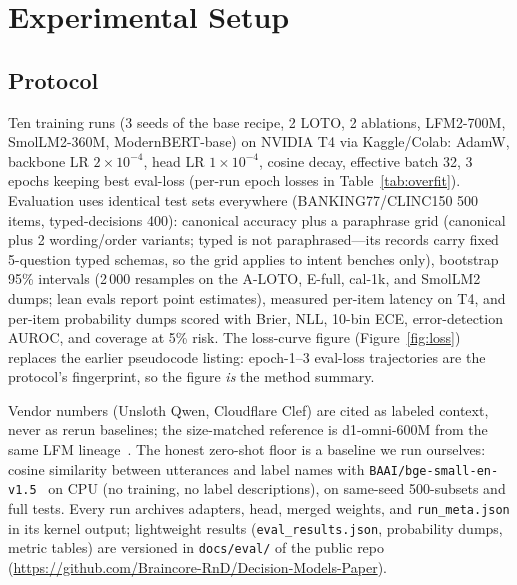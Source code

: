 \section{Experimental Setup}
\subsection{Protocol}
Ten training runs (3 seeds of the base recipe, 2 LOTO, 2 ablations, LFM2-700M,
SmolLM2-360M, ModernBERT-base) on NVIDIA
T4 via Kaggle/Colab: AdamW, backbone LR $2\times10^{-4}$, head LR
$1\times10^{-4}$, cosine decay, effective batch 32, 3 epochs keeping best
eval-loss (per-run epoch losses in Table~\ref{tab:overfit}). Evaluation uses identical test sets everywhere
(BANKING77/CLINC150 500 items, typed-decisions 400): canonical accuracy plus a
paraphrase grid (canonical plus 2 wording/order variants; typed is not
paraphrased---its records carry fixed 5-question typed schemas, so the grid
applies to intent benches only), bootstrap
95\% intervals (2\,000 resamples on the A-LOTO, E-full, cal-1k, and SmolLM2
dumps; lean evals report point
estimates), measured per-item latency on T4,
and per-item probability dumps scored
with Brier, NLL, 10-bin ECE, error-detection AUROC, and coverage at 5\% risk.
The loss-curve figure (Figure~\ref{fig:loss}) replaces the earlier
pseudocode listing: epoch-1--3 eval-loss trajectories are the protocol's
fingerprint, so the figure \emph{is} the method summary.

Vendor numbers (Unsloth Qwen, Cloudflare Clef) are cited as labeled context,
never as rerun baselines; the size-matched reference is d1-omni-600M from the
same LFM lineage~\cite{liquid-d1}. The honest zero-shot floor is a baseline we
run ourselves: cosine similarity between utterances and label names with
\texttt{BAAI/bge-small-en-v1.5}~\cite{bge-small} on CPU (no training, no
label descriptions), on same-seed 500-subsets and full tests. Every run archives adapters, head, merged
weights, and \texttt{run\_meta.json} in its kernel output; lightweight results
(\texttt{eval\_results.json}, probability dumps, metric tables) are versioned
in \texttt{docs/eval/} of the public repo
(\url{https://github.com/Braincore-RnD/Decision-Models-Paper}).

